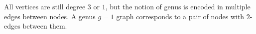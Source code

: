     All vertices are still degree \(3\) or \(1\), but the notion of genus is encoded in multiple edges between nodes. A genus \(g=1\) graph corresponds to a pair of nodes with \(2\)-edges between them.


    
    
